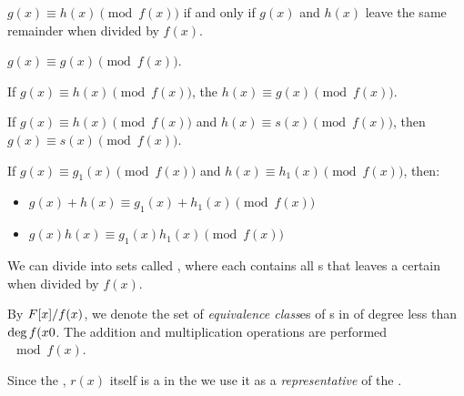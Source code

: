 \begin{propertylist}
\item $g(x) \equiv h(x) \pmod{f(x)}$ if and only if $g(x)$ and $h(x)$ leave the same remainder when divided by $f(x)$.\label{prop:Polynomial_Ring_Properties-Equivalence}
\item $g(x) \equiv g(x) \pmod{f(x)}$.\label{prop:Polynomial_Ring_Properties-Reflexivity}
\item If $g(x) \equiv h(x) \pmod{f(x)}$, the $h(x) \equiv g(x) \pmod{f(x)}$.\label{prop:Polynomial_Ring_Properties-Symmetry}
\item If $g(x) \equiv h(x) \pmod{f(x)}$ and $h(x) \equiv s(x) \pmod{f(x)}$, then $g(x) \equiv s(x) \pmod{f(x)}$.\label{prop:Polynomial_Ring_Properties-Transitivity}
\item If $g(x) \equiv g_{1}(x) \pmod{f(x)}$ and $h(x) \equiv h_{1}(x) \pmod{f(x)}$, then:\label{prop:Polynomial_Ring_Properties-Linearity}
\begin{itemize}[noitemsep]
\item $g(x) + h(x) \equiv g_{1}(x) + h_{1}(x) \pmod{f(x)}$
\item $g(x) h(x) \equiv g_{1}(x) h_{1}(x) \pmod{f(x)}$
\end{itemize}
\end{propertylist}

We can divide  into sets called , where each  contains all s that leaves a certain  when divided by $f(x)$.

\begin{definition}\label{def:Polynomial_Ring_Properties-Equivalence_Classes}
  By $F[x] / f(x)$, we denote the set of \emph{equivalence class}es of s in  of degree less than $\operatorname{\text{deg}} f(x0$.
  The addition and multiplication operations are performed $\mod f(x)$.
\end{definition}

\begin{definition}[Representative]\label{def:Polynomial_Ring_Properties-Representative}
  Since the , $r(x)$ itself is a  in the  we use it as a \emph{representative} of the .
\end{definition}

